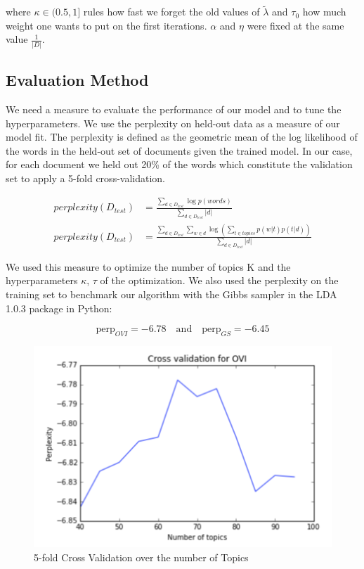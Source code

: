 \documentclass[twoside]{article}
\begin{document}
\begin{multicols}{2}
\noindent where $\kappa \in (0.5,1]$ rules how fast we forget the old values of $\tilde{\lambda}$ and $\tau_{0}$ how much weight one wants to put on the first iterations. $\alpha$ and $\eta$ were fixed at the same value $\frac{1}{|D|}$.

\subsection{Evaluation Method}

We need a measure to evaluate the performance of our model and to tune the hyperparameters. We use the perplexity on held-out data as a measure of our model fit. The perplexity is defined as the geometric mean of the log likelihood of the words in the held-out set of documents given the trained model. In our case, for each document we held out 20\% of the words which constitute the validation set to apply a 5-fold cross-validation.

\begin{align*}
	perplexity(D_{test}) & = \frac{\sum\limits_{d \in D_{test}} \log p(words)}{\sum\limits_{d \in D_{test}}|d|}\\
	perplexity(D_{test}) & = \frac{\sum\limits_{d \in D_{test}} \sum\limits_{w \in d} \log \left( \sum_{t \in topics} p(w|t)p(t|d) \right)}{\sum\limits_{d \in D_{test}}|d|}
\end{align*}

\noindent We used this measure to optimize the number of topics K and the hyperparameters $\kappa$, $\tau$ of the optimization. We also used the perplexity on the training set to benchmark our algorithm with the Gibbs sampler in the LDA 1.0.3 package in Python:

$$\text{perp}_{OVI} = -6.78 \quad \text{and} \quad \text{perp}_{GS} = -6.45$$

\begin{figure}[H]
\centering
\includegraphics[width=1\linewidth]{img/V.png}
\caption{5-fold Cross Validation over the number of Topics}
\end{figure}


\end{multicols}
\end{document}
